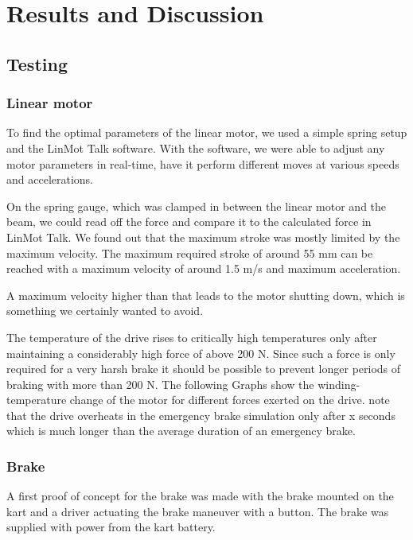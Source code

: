 
\chapter{Results and Discussion}
\label{chp:Results}

\section{Testing}

\subsection{Linear motor}

To find the optimal parameters of the linear motor, we used a simple spring setup and the LinMot Talk software. With the software, we were able to adjust any motor parameters in real-time, have it perform different moves at various speeds and accelerations.

 On the spring gauge, which was clamped in between the linear motor and the beam, we could read off the force and compare it to the calculated force in LinMot Talk. We found out that the maximum stroke was mostly limited by the maximum velocity. The maximum required stroke of around 55 mm can be reached with a maximum velocity of around 1.5 m/s and maximum acceleration.
 
  A maximum velocity higher than that leads to the motor shutting down, which is something we certainly wanted to avoid. 
  
  The temperature of the drive rises to critically high temperatures only after maintaining a considerably high force of above 200 N. Since such a force is only required for a very harsh brake it should be possible to prevent longer periods of braking with more than 200 N. The following Graphs show the winding-temperature change of the motor for different forces exerted on the drive.
  note that the drive overheats in the emergency brake simulation only after x seconds which is much longer than the average duration of an emergency brake.
 
  
  



\subsection{Brake}
A first proof of concept for the brake was made with the brake mounted on the kart and a driver actuating the brake maneuver with a button.
The brake was supplied with power from the kart battery.



